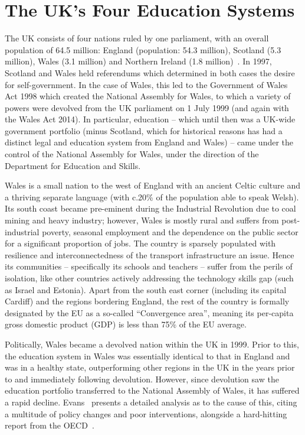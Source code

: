 \documentclass{llncs}
\begin{document}
\section{The UK's Four Education Systems}\label{welshukedu}

The UK consists of four nations ruled by one parliament, with an
overall population of 64.5 million: England (population: 54.3
million), Scotland (5.3 million), Wales (3.1 million) and Northern
Ireland (1.8 million)~\cite{onspop:2016}. In 1997, Scotland and Wales
held referendums which determined in both cases the desire for
self-government.  In the case of Wales, this led to the Government of
Wales Act 1998 which created the National Assembly for Wales, to which
a variety of powers were devolved from the UK parliament on 1 July
1999 (and again with the Wales Act 2014).  In particular, education --
which until then was a UK-wide government portfolio (minus Scotland,
which for historical reasons has had a distinct legal and education
system from England and Wales) -- came under the control of the
National Assembly for Wales, under the direction of the Department for
Education and Skills.

Wales is a small nation to the west of England with an ancient Celtic
culture and a thriving separate language (with c.20\% of the population able to
speak Welsh).  Its south coast became pre-eminent during the
Industrial Revolution due to coal mining and heavy industry; however,
Wales is mostly rural and suffers from post-industrial poverty,
seasonal employment and the dependence on the public sector for a
significant proportion of jobs. The country is sparsely populated with
resilience and interconnectedness of the transport infrastructure an
issue.  Hence its communities -- specifically its schools and
teachers -- suffer from the perils of isolation, like other countries
actively addressing the technology skills gap (such as Israel and
Estonia). Apart from the south east corner (including its capital
Cardiff) and the regions bordering England, the rest of the country is
formally designated by the EU as a so-called ``Convergence area'',
meaning its per-capita gross domestic product (GDP) is less than 75\%
of the EU average.

Politically, Wales became a devolved nation within the UK in 1999.
Prior to this, the education system in Wales was essentially
identical to that in England and was in a healthy state, outperforming
other regions in the UK in the years prior to and immediately
following devolution.  However, since devolution saw the education
portfolio transferred to the National Assembly of Wales, it has
suffered a rapid decline. Evans~\cite{Evans:2015} presents a
detailed analysis as to the cause of this, citing a multitude of
policy changes and poor interventions, alongside a hard-hitting report
from the OECD~\cite{oecdwales:2014}.
\end{document}
